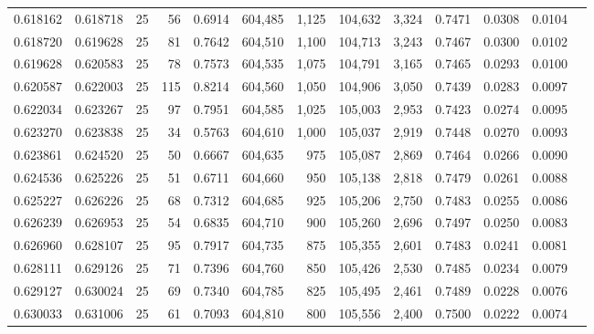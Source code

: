 \begin{tabular}{rrrrrrrrrrrrr}
0.618162 & 0.618718 &    25 &  56 &                                     0.6914 & 604,485 &   1,125 & 104,632 &   3,324 & 0.7471 & 0.0308 & 0.0104 \\
0.618720 & 0.619628 &    25 &  81 &                                     0.7642 & 604,510 &   1,100 & 104,713 &   3,243 & 0.7467 & 0.0300 & 0.0102 \\
0.619628 & 0.620583 &    25 &  78 &                                     0.7573 & 604,535 &   1,075 & 104,791 &   3,165 & 0.7465 & 0.0293 & 0.0100 \\
0.620587 & 0.622003 &    25 & 115 &                                     0.8214 & 604,560 &   1,050 & 104,906 &   3,050 & 0.7439 & 0.0283 & 0.0097 \\
0.622034 & 0.623267 &    25 &  97 &                                     0.7951 & 604,585 &   1,025 & 105,003 &   2,953 & 0.7423 & 0.0274 & 0.0095 \\
0.623270 & 0.623838 &    25 &  34 &                                     0.5763 & 604,610 &   1,000 & 105,037 &   2,919 & 0.7448 & 0.0270 & 0.0093 \\
0.623861 & 0.624520 &    25 &  50 &                                     0.6667 & 604,635 &     975 & 105,087 &   2,869 & 0.7464 & 0.0266 & 0.0090 \\
0.624536 & 0.625226 &    25 &  51 &                                     0.6711 & 604,660 &     950 & 105,138 &   2,818 & 0.7479 & 0.0261 & 0.0088 \\
0.625227 & 0.626226 &    25 &  68 &                                     0.7312 & 604,685 &     925 & 105,206 &   2,750 & 0.7483 & 0.0255 & 0.0086 \\
0.626239 & 0.626953 &    25 &  54 &                                     0.6835 & 604,710 &     900 & 105,260 &   2,696 & 0.7497 & 0.0250 & 0.0083 \\
0.626960 & 0.628107 &    25 &  95 &                                     0.7917 & 604,735 &     875 & 105,355 &   2,601 & 0.7483 & 0.0241 & 0.0081 \\
0.628111 & 0.629126 &    25 &  71 &                                     0.7396 & 604,760 &     850 & 105,426 &   2,530 & 0.7485 & 0.0234 & 0.0079 \\
0.629127 & 0.630024 &    25 &  69 &                                     0.7340 & 604,785 &     825 & 105,495 &   2,461 & 0.7489 & 0.0228 & 0.0076 \\
0.630033 & 0.631006 &    25 &  61 &                                     0.7093 & 604,810 &     800 & 105,556 &   2,400 & 0.7500 & 0.0222 & 0.0074 \\

\end{tabular}

